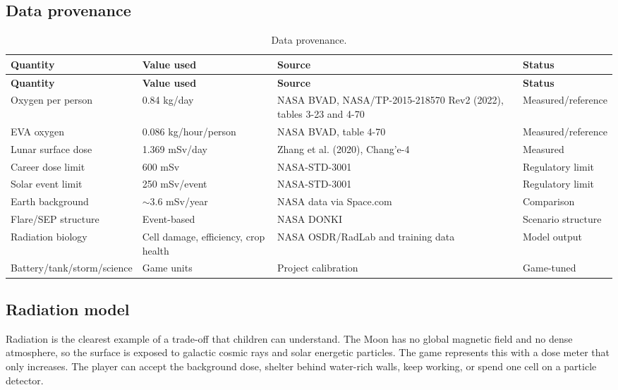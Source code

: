 \documentclass[11pt,a4paper]{article}
\begin{document}
\subsection{Data provenance}

\begin{longtable}{@{}p{3.7cm}p{3.2cm}p{5.6cm}p{3.0cm}@{}}
\caption{Data provenance.}\label{tab:data}\\
\toprule
\textbf{Quantity} & \textbf{Value used} & \textbf{Source} & \textbf{Status}\\
\midrule
\endfirsthead
\toprule
\textbf{Quantity} & \textbf{Value used} & \textbf{Source} & \textbf{Status}\\
\midrule
\endhead
Oxygen per person & 0.84 kg/day & NASA BVAD, NASA/TP-2015-218570 Rev2 (2022), tables 3-23 and 4-70 \cite{bvad} & Measured/reference\\
EVA oxygen & 0.086 kg/hour/person & NASA BVAD, table 4-70 \cite{bvad} & Measured/reference\\
Lunar surface dose & 1.369 mSv/day & Zhang et al. (2020), Chang'e-4 \cite{zhang2020} & Measured\\
Career dose limit & 600 mSv & NASA-STD-3001 \cite{nasa3001} & Regulatory limit\\
Solar event limit & 250 mSv/event & NASA-STD-3001 \cite{nasa3001} & Regulatory limit\\
Earth background & $\sim$3.6 mSv/year & NASA data via Space.com \cite{earth} & Comparison\\
Flare/SEP structure & Event-based & NASA DONKI \cite{donki} & Scenario structure\\
Radiation biology & Cell damage, efficiency, crop health & NASA OSDR/RadLab \cite{osdr} and training data & Model output\\
Battery/tank/storm/science & Game units & Project calibration & Game-tuned\\
\bottomrule
\end{longtable}

\subsection{Radiation model}

Radiation is the clearest example of a trade-off that children can understand. The Moon has no global magnetic field and no dense atmosphere, so the surface is exposed to galactic cosmic rays and solar energetic particles. The game represents this with a dose meter that only increases. The player can accept the background dose, shelter behind water-rich walls, keep working, or spend one cell on a particle detector.
\end{document}
